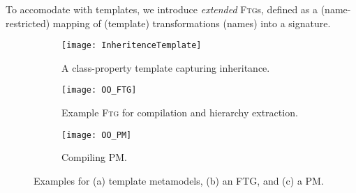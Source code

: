 To accomodate with templates, we introduce \emph{extended} \textsc{Ftg}s, 
defined as a (name-restricted) mapping of (template) transformations (names) 
into a signature.

\begin{figure}
\centering
\begin{subfigure}[t]{0.3\linewidth}
\centering
\texttt{[image: InheritenceTemplate]}
\caption{A class-property template capturing inheritance.}
  \label{fig:InheritenceTemplate}
\end{subfigure}
\begin{subfigure}[t]{0.35\linewidth}
\centering
\texttt{[image: OO\_FTG]}
\caption{Example \textsc{Ftg} for compilation and hierarchy extraction.}
\label{fig:OO_FTG}
\end{subfigure}
\begin{subfigure}[t]{0.3\linewidth}
\centering
\texttt{[image: OO\_PM]}
\caption{Compiling \textsc{PM}.}
\label{fig:OO_PM}
\end{subfigure}
\caption{Examples for (a) template metamodels, (b) an FTG, and (c) a PM.}
\end{figure}



